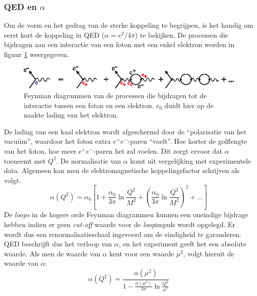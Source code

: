 \documentclass[a4paper,11pt]{article}
\numberwithin{equation}{section} %
\begin{document}
    \subsubsection{QED en $\alpha$} \label{sec:QED}
Om de vorm en het gedrag van de sterke koppeling te begrijpen, is het handig om eerst kort de koppeling in QED ($\alpha = e^2/4\pi$) te bekijken.
De processen die bijdragen aan een interactie van een foton met een enkel elektron worden in figuur \ref{fig:QED} weergegeven.
\begin{figure} [H]
  \begin{center}
    \includegraphics[width=.66\textwidth]{Afbeeldingen/QED.eps}
    \caption{Feynman diagrammen van de processen die bijdragen tot de interactie tussen een foton en een elektron. $e_0$ duidt hier op de naakte lading van het elektron.}
   \label{fig:QED}
  \end{center}
\end{figure}
De lading van een kaal elektron wordt afgeschermd door de “polarisatie van het vacuüm”, waardoor het foton extra $e^+ e^-$-paren “voelt”.
Hoe korter de golflengte van het foton, hoe meer $e^+ e^-$-paren het zal voelen.
Dit zorgt ervoor dat $\alpha$ toeneemt met $Q^2$.
De normalisatie van $\alpha$ komt uit vergelijking met experimentele data.
Algemeen kan men de elektromagnetische koppelingsfactor schrijven als volgt.
\begin{equation}
\alpha(Q^2) = \alpha_0 \left[ 1+ \frac{\alpha_0}{3\pi} \ln{\frac{Q^2}{M^2}} + \left( \frac{\alpha_0}{3\pi} \ln{\frac{Q^2}{M^2}} \right)^2 +\hdots \right]
\end{equation}
De \textit{loops} in de hogere orde Feynman diagrammen kunnen een oneindige bijdrage hebben indien er geen \textit{cut-off} waarde voor de \textit{loop}impuls wordt opgelegd.
Er wordt dus een renormalisatieschaal ingevoerd om de eindigheid te garanderen.
QED beschrijft dus het verloop van $\alpha$, en het experiment geeft het een absolute waarde.
Als men de waarde van $\alpha$ kent voor een waarde $\mu^2$, volgt hieruit de waarde van $\alpha$:
\begin{equation} \label{eq:alpha}
\alpha( Q^2 ) =\frac{\alpha(\mu^2)}{1-\frac{\alpha(\mu^2)}{3\pi} \ln{\frac{Q^2}{\mu^2}}}
\end{equation}
\end{document}

